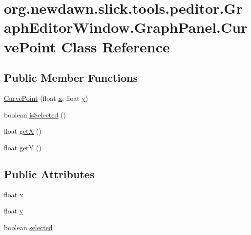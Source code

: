 \hypertarget{classorg_1_1newdawn_1_1slick_1_1tools_1_1peditor_1_1_graph_editor_window_1_1_graph_panel_1_1_curve_point}{}\section{org.\+newdawn.\+slick.\+tools.\+peditor.\+Graph\+Editor\+Window.\+Graph\+Panel.\+Curve\+Point Class Reference}
\label{classorg_1_1newdawn_1_1slick_1_1tools_1_1peditor_1_1_graph_editor_window_1_1_graph_panel_1_1_curve_point}
\subsection*{Public Member Functions}
\begin{DoxyCompactItemize}
\item 
\mbox{\hyperlink{classorg_1_1newdawn_1_1slick_1_1tools_1_1peditor_1_1_graph_editor_window_1_1_graph_panel_1_1_curve_point_ac0e00636a3b71dbebf24d8483ed79a5e}{Curve\+Point}} (float \mbox{\hyperlink{classorg_1_1newdawn_1_1slick_1_1tools_1_1peditor_1_1_graph_editor_window_1_1_graph_panel_1_1_curve_point_a047a6ee9ca0a301f32471ca8dbff20fe}{x}}, float \mbox{\hyperlink{classorg_1_1newdawn_1_1slick_1_1tools_1_1peditor_1_1_graph_editor_window_1_1_graph_panel_1_1_curve_point_a192de23a4a5d1bdcdb9599de910cc4e5}{y}})
\item 
boolean \mbox{\hyperlink{classorg_1_1newdawn_1_1slick_1_1tools_1_1peditor_1_1_graph_editor_window_1_1_graph_panel_1_1_curve_point_a50644c1f8f78cd69536278cf2ef2e090}{is\+Selected}} ()
\item 
float \mbox{\hyperlink{classorg_1_1newdawn_1_1slick_1_1tools_1_1peditor_1_1_graph_editor_window_1_1_graph_panel_1_1_curve_point_a9b2de302e69598357b1d1cb779bb0381}{getX}} ()
\item 
float \mbox{\hyperlink{classorg_1_1newdawn_1_1slick_1_1tools_1_1peditor_1_1_graph_editor_window_1_1_graph_panel_1_1_curve_point_a397cd6f57a2a6cc9eec2a0d3311ba8ce}{getY}} ()
\end{DoxyCompactItemize}
\subsection*{Public Attributes}
\begin{DoxyCompactItemize}
\item 
float \mbox{\hyperlink{classorg_1_1newdawn_1_1slick_1_1tools_1_1peditor_1_1_graph_editor_window_1_1_graph_panel_1_1_curve_point_a047a6ee9ca0a301f32471ca8dbff20fe}{x}}
\item 
float \mbox{\hyperlink{classorg_1_1newdawn_1_1slick_1_1tools_1_1peditor_1_1_graph_editor_window_1_1_graph_panel_1_1_curve_point_a192de23a4a5d1bdcdb9599de910cc4e5}{y}}
\item 
boolean \mbox{\hyperlink{classorg_1_1newdawn_1_1slick_1_1tools_1_1peditor_1_1_graph_editor_window_1_1_graph_panel_1_1_curve_point_a606ae5d752030e493c64a1422f42ba17}{selected}}
\end{DoxyCompactItemize}


